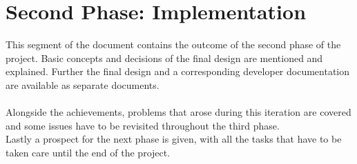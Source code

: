 \section{Second Phase: Implementation}
This segment of the document contains the outcome of the second phase of the project. Basic concepts and decisions of the final design are mentioned and explained. Further the final design and a corresponding developer documentation are available as separate documents. \\
~\\
Alongside the achievements, problems that arose during this iteration are covered and some issues have to be revisited throughout the third phase. \\
Lastly a prospect for the next phase is given, with all the tasks that have to be taken care until the end of the project. 